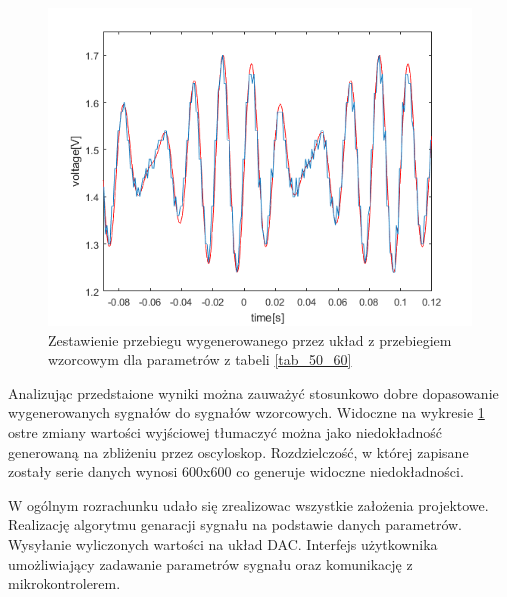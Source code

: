 \begin{figure}[H]
	\centering
	\includegraphics[scale = 0.8]{fig/50_60.png}
	\caption		
	{Zestawienie przebiegu wygenerowanego przez układ z przebiegiem wzorcowym dla parametrów z tabeli \ref{tab_50_60}}
	\label{fig:50_60}
\end{figure}

\indent Analizując przedstaione wyniki można zauważyć stosunkowo dobre dopasowanie wygenerowanych sygnałów do sygnałów wzorcowych. Widoczne na wykresie \ref{fig:50_60} ostre zmiany wartości wyjściowej tłumaczyć można jako niedokładność generowaną na zbliżeniu przez oscyloskop. Rozdzielczość, w której zapisane zostały serie danych wynosi 600x600 co generuje widoczne niedokładności.

\indent W ogólnym rozrachunku udało się zrealizowac wszystkie założenia projektowe. Realizację algorytmu genaracji sygnału na podstawie danych parametrów. Wysyłanie wyliczonych wartości na układ DAC. Interfejs użytkownika umożliwiający zadawanie parametrów sygnału oraz komunikację z mikrokontrolerem.